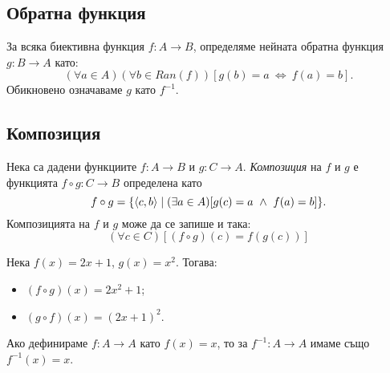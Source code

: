 \subsection*{Обратна функция}

За всяка биективна функция $f:A\to B$, определяме нейната обратна функция $g:B \to  A$ като:
\[(\forall a \in A)(\forall b \in Ran(f))[g(b) = a\ \iff\ f(a) = b].\]
Обикновено означаваме $g$ като $f^{-1}$.

\subsection*{Композиция}

Нека са дадени функциите $f:A\to B$ и $g:C\to A$.
{\em Композиция} на $f$ и $g$ е функцията $f\circ g: C \to B$ определена като
\[f\circ g = \{\langle{c,b}\rangle\mid (\exists a\in A)[g(c) = a\ \wedge\ f(a) = b]\}.\]
Композицията на $f$ и $g$ може да се запише и така:
\[(\forall c\in C)[(f\circ g)(c) = f(g(c))]\]

\begin{example}
  Нека $f(x) = 2x+1$, $g(x) = x^2$. Тогава:
  \begin{itemize}
  \item 
    $(f\circ g)(x) = 2x^2 + 1$;
  \item
    $(g\circ f)(x) = (2x+1)^2$.
  \end{itemize}
\end{example}

\begin{example}
  Ако дефинираме $f:A\to A$ като $f(x) = x$, 
  то за $f^{-1}:A\to A$ имаме също $f^{-1}(x) = x$.
\end{example}

  





  
